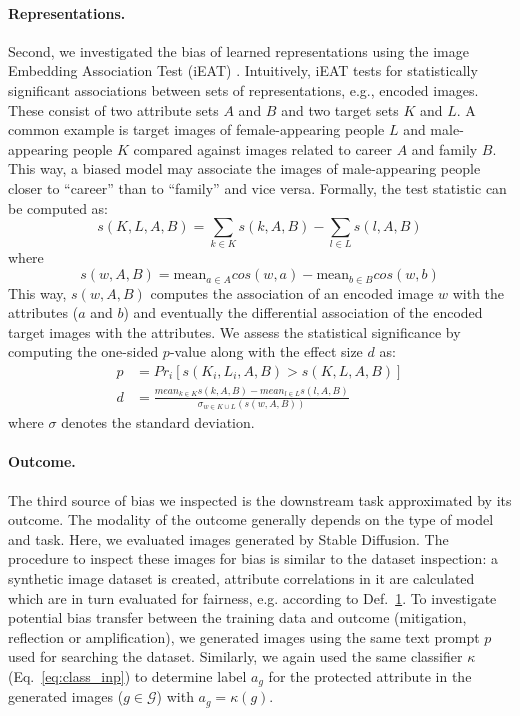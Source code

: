 \documentclass{article}%
\begin{document}
\paragraph{Representations.}
Second, we investigated the bias of learned representations using the image Embedding Association Test (iEAT) \cite{steed21image}.
Intuitively, iEAT tests for statistically significant associations between sets of representations, e.g., encoded images. These consist of two attribute sets $A$ and $B$ and two target sets $K$ and $L$. A common example is target images of female-appearing people $L$ and male-appearing people $K$ compared against images related to career $A$ and family $B$. This way, a biased model may associate the images of male-appearing people closer to ``career'' than to ``family'' and vice versa.
Formally, the test statistic can be computed as:
\begin{equation}
    s(K,L,A,B) = \sum_{k\in K}s(k,A,B) - \sum_{l\in L}s(l,A,B)
\end{equation}
where
\begin{equation}
    s(w,A,B) = \text{mean}_{a\in A}cos(w,a) - \text{mean}_{b\in B}cos(w,b)
\end{equation}
 This way, $s(w,A,B)$ computes the association of an encoded image $w$ with the attributes ($a$ and $b$) and eventually the differential association of the encoded target images with the attributes.
We assess the statistical significance by computing the one-sided $p$-value along with the effect size $d$ as:
\begin{align}
    p&=Pr_i[s(K_i,L_i,A,B)>s(K,L,A,B)] \\
    d&=\frac{mean_{k\in K}s(k,A,B) - mean_{l\in L}s(l,A,B)}{\sigma_{w\in K \cup L}(s(w,A,B))}
\end{align}
where $\sigma$ denotes the standard deviation.

\paragraph{Outcome.}
The third source of bias we inspected is the downstream task approximated by its outcome. 
The modality of the outcome generally depends on the type of model and task. Here, we evaluated images generated by Stable Diffusion. 
The procedure to inspect these images for bias is similar to the dataset inspection: a synthetic image dataset is created, attribute correlations in it are calculated which are in turn evaluated for fairness, e.g. according to Def.~\hyperref[def:fair1]{1}.
To investigate potential bias transfer between the training data and outcome (mitigation, reflection or amplification), we generated images using the same text prompt $p$ used for searching the dataset. 
Similarly, we again used the same classifier $\kappa$ (Eq.~\ref{eq:class_inp}) to determine label $a_g$ for the protected attribute in the generated images ($g\in\mathcal{G}$) with $a_g = \kappa(g)$.
\end{document}
